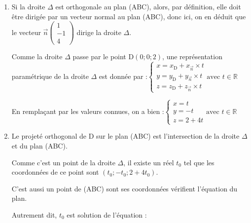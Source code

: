 \documentclass[10pt]{article}
\providecommand{\R}{\mathbb{R}}
\providecommand{\vect}[1]{\overrightarrow{#1}}
\begin{document}
\begin{enumerate}
\begin{enumerate}
		Comme A est un point de (ABC), on doit avoir :\quad $x_{\mathrm{A}} - y_{\mathrm{A}} + 4z_{\mathrm{A}} + d =0$.

		$\begin{aligned}
			x_{\mathrm{A}} - y_{\mathrm{A}} + 4z_{\mathrm{A}} + d =0
			&\iff 2 - 1 + 4\times 1 + d= 0\\
			&\iff 5 + d = 0\\
			&\iff d = -5
		\end{aligned}		$

		Une équation cartésienne de (ABC) est donc bien :\quad $x-y+4z - 5 = 0$.
	\end{enumerate}

	\item Si la droite $\Delta$ est orthogonale au plan (ABC), alors, par définition, elle doit être dirigée par un vecteur normal au plan (ABC), donc ici, on en déduit que le vecteur $\vect{n} \begin{pmatrix} 1\\-1\\4 \end{pmatrix}$ dirige la droite $\Delta$.

	Comme la droite $\Delta$ passe par le point D$(0 ; 0 ; 2)$, une représentation paramétrique de la droite $\Delta$ est donnée par :\quad $\begin{cases}
		x=x_{\mathrm{D}} + x_{\vect{n}}\times t\\
		y=y_{\mathrm{D}} + y_{\vect{n}}\times t\\
		z=z_{\mathrm{D}} + z_{\vect{n}}\times t
	\end{cases}\text{avec } t \in \R$

	En remplaçant par les valeurs connues, on a bien :\quad $\begin{cases}
		x=t\\
		y=-t\\
		z=2+4t
	\end{cases}\text{avec } t \in \R$

	\item Le projeté orthogonal de D sur le plan (ABC) est l'intersection de la droite $\Delta$ et du plan (ABC).

	Comme c'est un point de la droite $\Delta$, il existe un réel $t_0$ tel que les coordonnées de ce point sont $(t_0 ; -t_0 ; 2+4t_0)$.

	C'est aussi un point de (ABC) sont ses coordonnées vérifient l'équation du plan.

	Autrement dit, $t_0$ est solution de l'équation :


\end{enumerate}
\end{document}
